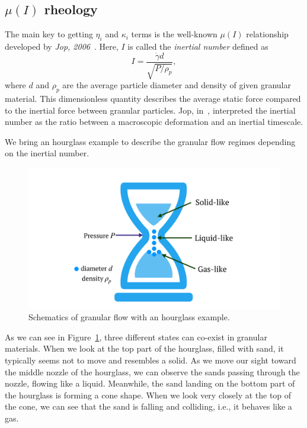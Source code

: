 \subsection{$\mu (I)$ rheology}
The main key to getting $\eta_i$ and $\kappa_i$ terms is the well-known $\mu(I)$ relationship developed by \textit{Jop, 2006}~\cite{jop_constitutive_2006}.
Here, $I$ is called the \textit{inertial number} defined as 
\begin{equation}
  I =  \frac{\dot{\gamma} d }{\sqrt{P/\rho_p}},
  \label{eq_inertialI}
\end{equation}
where $d$ and $\rho_p$ are the average particle diameter and density of given granular material.
This dimensionless quantity describes the average static force compared to the inertial force between granular particles. Jop, in~\cite{jop_constitutive_2006}, interpreted the inertial number as the ratio between a macroscopic deformation and an inertial timescale. 
\par
We bring an hourglass example to describe the granular flow regimes depending on the inertial number. 
\begin{figure}[ht]
  \begin{center}
    \includegraphics[scale=0.2]{figures/fig_hourglass.pdf}
    \end{center}
  \caption{Schematics of granular flow with an hourglass example.}
  \label{fig_hourglass}
\end{figure}
As we can see in Figure~\ref{fig_hourglass}, three different states can co-exist in granular materials. 
When we look at the top part of the hourglass, filled with sand, it typically seems not to move and resembles a solid. 
As we move our sight toward the middle nozzle of the hourglass, we can observe the sands passing through the nozzle, flowing like a liquid.
Meanwhile, the sand landing on the bottom part of the hourglass is forming a cone shape. When we look very closely at the top of the cone, we can see that the sand is falling and colliding, i.e., it behaves like a gas.
